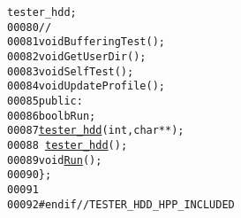 \begin{footnotesize}
\begin{alltt}
      tester\_hdd; 
00080         \textcolor{comment}{//}
00081         \textcolor{keywordtype}{void} BufferingTest();
00082         \textcolor{keywordtype}{void} GetUserDir();
00083         \textcolor{keywordtype}{void} SelfTest();
00084         \textcolor{keywordtype}{void} UpdateProfile();
00085     \textcolor{keyword}{public}:
00086         \textcolor{keywordtype}{bool} bRun;
00087         \hyperlink{classtester__hdd_af43b8ca9595ed8ebf14b2c7cffe561c2}{tester_hdd}(\textcolor{keywordtype}{int},\textcolor{keywordtype}{char} **);
00088         ~\hyperlink{classtester__hdd}{tester_hdd}();
00089         \textcolor{keywordtype}{void} \hyperlink{classtester__hdd_abfdcc395e8be504dfd0ea686da790375}{Run}();
00090 \};
00091 
00092 \textcolor{preprocessor}{#endif // TESTER\_HDD\_HPP\_INCLUDED}
\end{alltt}\end{footnotesize}
